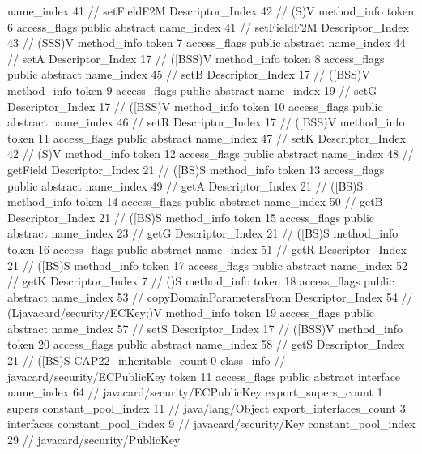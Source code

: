 {{{{{					name_index	41		// setFieldF2M
					Descriptor_Index	42		// (S)V
				}
				method_info {
					token	6
					access_flags	public abstract
					name_index	41		// setFieldF2M
					Descriptor_Index	43		// (SSS)V
				}
				method_info {
					token	7
					access_flags	public abstract
					name_index	44		// setA
					Descriptor_Index	17		// ([BSS)V
				}
				method_info {
					token	8
					access_flags	public abstract
					name_index	45		// setB
					Descriptor_Index	17		// ([BSS)V
				}
				method_info {
					token	9
					access_flags	public abstract
					name_index	19		// setG
					Descriptor_Index	17		// ([BSS)V
				}
				method_info {
					token	10
					access_flags	public abstract
					name_index	46		// setR
					Descriptor_Index	17		// ([BSS)V
				}
				method_info {
					token	11
					access_flags	public abstract
					name_index	47		// setK
					Descriptor_Index	42		// (S)V
				}
				method_info {
					token	12
					access_flags	public abstract
					name_index	48		// getField
					Descriptor_Index	21		// ([BS)S
				}
				method_info {
					token	13
					access_flags	public abstract
					name_index	49		// getA
					Descriptor_Index	21		// ([BS)S
				}
				method_info {
					token	14
					access_flags	public abstract
					name_index	50		// getB
					Descriptor_Index	21		// ([BS)S
				}
				method_info {
					token	15
					access_flags	public abstract
					name_index	23		// getG
					Descriptor_Index	21		// ([BS)S
				}
				method_info {
					token	16
					access_flags	public abstract
					name_index	51		// getR
					Descriptor_Index	21		// ([BS)S
				}
				method_info {
					token	17
					access_flags	public abstract
					name_index	52		// getK
					Descriptor_Index	7		// ()S
				}
				method_info {
					token	18
					access_flags	public abstract
					name_index	53		// copyDomainParametersFrom
					Descriptor_Index	54		// (Ljavacard/security/ECKey;)V
				}
				method_info {
					token	19
					access_flags	public abstract
					name_index	57		// setS
					Descriptor_Index	17		// ([BSS)V
				}
				method_info {
					token	20
					access_flags	public abstract
					name_index	58		// getS
					Descriptor_Index	21		// ([BS)S
				}
			}
			CAP22_inheritable_count	0
		}
		class_info {		// javacard/security/ECPublicKey
			token	11
			access_flags	public abstract interface
			name_index	64		// javacard/security/ECPublicKey
			export_supers_count	1
			supers {
				constant_pool_index	11		// java/lang/Object
			}
			export_interfaces_count	3
			interfaces {
				constant_pool_index	9		// javacard/security/Key
				constant_pool_index	29		// javacard/security/PublicKey
}}}}

